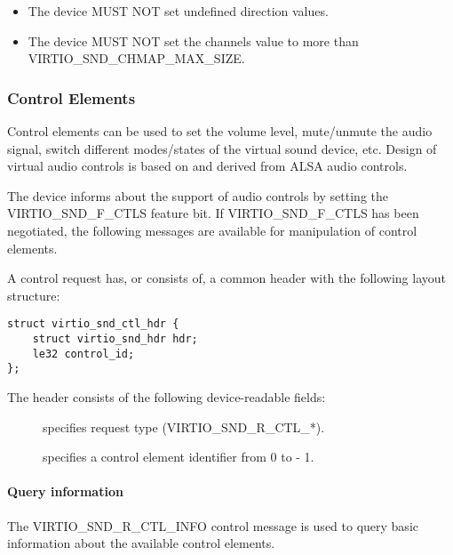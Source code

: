 
\begin{itemize}
\item The device MUST NOT set undefined direction values.
\item The device MUST NOT set the channels value to more than VIRTIO_SND_CHMAP_MAX_SIZE.
\end{itemize}

\subsubsection{Control Elements}\label{sec:Device Types / Sound Device / Device Operation / Control Elements}

Control elements can be used to set the volume level, mute/unmute the audio
signal, switch different modes/states of the virtual sound device, etc. Design
of virtual audio controls is based on and derived from ALSA audio controls.

The device informs about the support of audio controls by setting the
VIRTIO_SND_F_CTLS feature bit. If VIRTIO_SND_F_CTLS has been negotiated, the
following messages are available for manipulation of control elements.

A control request has, or consists of, a common header with the following
layout structure:

\begin{lstlisting}
struct virtio_snd_ctl_hdr {
    struct virtio_snd_hdr hdr;
    le32 control_id;
};
\end{lstlisting}

The header consists of the following device-readable fields:

\begin{description}
\item[] specifies request type (VIRTIO_SND_R_CTL_*).
\item[] specifies a control element identifier from 0 to
 - 1.
\end{description}

\paragraph{Query information}

The VIRTIO_SND_R_CTL_INFO control message is used to query basic information
about the available control elements.

